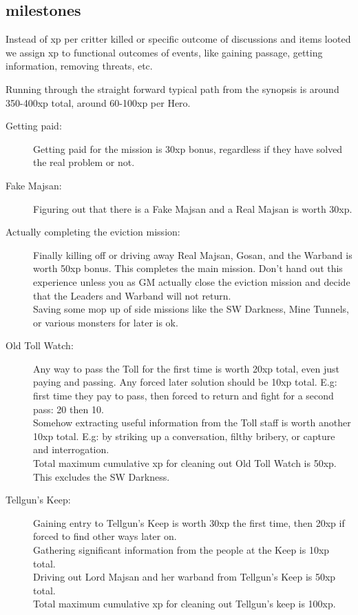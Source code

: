 \subsection*{milestones}
Instead of xp per critter killed or specific outcome of discussions and items looted we assign xp to functional outcomes of events, like gaining passage, getting information, removing threats, etc.

Running through the straight forward typical path from the synopsis is around 350-400xp total, around 60-100xp per Hero.

\begin{description}

\item[Getting paid:] Getting paid for the mission is 30xp bonus, regardless if they have solved the real problem or not.

\item[Fake Majsan:] Figuring out that there is a Fake Majsan and a Real Majsan is worth 30xp.

\item[Actually completing the eviction mission:] Finally killing off or driving away Real Majsan, Gosan, and the Warband is worth 50xp bonus. This completes the main mission. Don't hand out this experience unless you as GM actually close the eviction mission and decide that the Leaders and Warband will not return.\\
Saving some mop up of side missions like the SW Darkness, Mine Tunnels, or various monsters for later is ok.

\item[Old Toll Watch:] Any way to pass the Toll for the first time is worth 20xp total, even just paying and passing. Any forced later solution should be 10xp total. E.g: first time they pay to pass, then forced to return and fight for a second pass: 20 then 10.\\
Somehow extracting useful information from the Toll staff is worth another 10xp total. E.g: by striking up a conversation, filthy bribery, or capture and interrogation.\\
Total maximum cumulative xp for cleaning out Old Toll Watch is 50xp. This excludes the SW Darkness.

\item[Tellgun's Keep:] Gaining entry to Tellgun's Keep is worth 30xp the first time, then 20xp if forced to find other ways later on.\\
Gathering significant information from the people at the Keep is 10xp total.\\
Driving out Lord Majsan and her warband from Tellgun's Keep is 50xp total.\\
Total maximum cumulative xp for cleaning out Tellgun's keep is 100xp.


\end{description}
